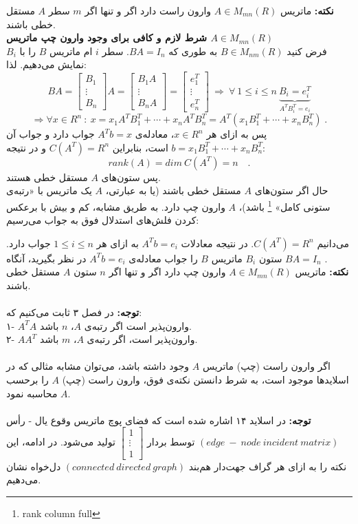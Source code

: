 \textbf{نکته:}
 ماتریس $A\in M_{mn}(R) $ وارون راست دارد اگر و تنها اگر $m$ سطر $A$ مستقل خطی باشند.\\
\textbf{شرط لازم و کافی برای وجود وارون چپ ماتریس $A\in M_{mn}(R)$}\\
فرض کنید $B\in M_{nm}(R)$ به طوری که $BA=I_n$. سطر $i$ ام ماتریس $B$ را با $B_i$ نمایش می‌دهیم. لذا:
$$BA = \begin{bmatrix}
B_1\\ \vdots \\ B_n
\end{bmatrix}A = \begin{bmatrix}
B_1A\\ \vdots \\ B_nA
\end{bmatrix}= \begin{bmatrix}
e_1^T\\ \vdots \\ e_n^T
\end{bmatrix} \: \Rightarrow \: \forall \: 1 \leq i \leq n\: \underbrace{B_i = e_i^T}_{A^TB_i^T = e_i}$$
$$\Rightarrow \forall x \in R^n \: :\: x= x_1A^TB_1^T+\cdots + x_nA^TB_n^T = A^T(x_1B_1^T+\cdots+ x_nB_n^T) \; .$$
پس به ازای هر $x\in R^n$، معادله‌ی $A^Tb = x$ جواب دارد و جواب آن $b = x_1B_1^T+\cdots+x_nB_n^T$ است، بنابراین $C(A^T)=R^n$ و در نتیجه:
$$rank(A) = dim\: C(A^T) = n\quad .$$
پس ستون‌های $A$ مستقل خطی هستند.\\
حال اگر ستون‌های $A$ مستقل خطی باشند (یا به عبارتی، $A$ یک ماتریس با «رتبه‌ی ستونی کامل» \footnote{rank column full} باشد)،  $A$ وارون چپ دارد. به طریق مشابه، کم و بیش با برعکس کردن فلش‌های استدلال فوق به جواب می‌رسیم:

می‌دانیم
$C(A^T) = R^n$. در نتیجه معادلات $A^Tb = e_i$ به ازای هر $1\leq i \leq n$ جواب دارد. ستون $B_i$ ماتریس $B$ را جواب معادله‌ی $A^Tb = e_i$ در نظر بگیرید، آنگاه $BA=I_n$ .\\
\textbf{نکته:}
ماتریس $A\in M_{mn}(R)$ وارون چپ دارد اگر و تنها اگر $n$ ستون $A$ مستقل خطی باشند.\\\\
\textbf{توجه:} در فصل ۳ ثابت می‌کنیم که:\\
۱- $A^TA$ وارون‌پذیر است اگر رتبه‌ی $A$، $n$ باشد.\\
۲- $AA^T$ وارون‌پذیر است، اگر رتبه‌ی $A$، $m$ باشد.\\\\
اگر وارون راست (چپ) ماتریس $A$ وجود داشته باشد، می‌توان مشابه مثالی که در اسلاید‌ها موجود است، به شرط دانستن نکته‌ی فوق، وارون راست (چپ) $A$ را برحسب $A$ محاسبه نمود.\\\\
\textbf{توجه:}
در اسلاید ۱۴ اشاره شده است که فضا‌ی پوچ ماتریس وقوع یال - رأس $(edge\: -\:node \:incident\: matrix)$ توسط بردار 
$\begin{bmatrix}
1\\ \vdots \\ 1
\end{bmatrix}$ تولید می‌شود. در ادامه، این نکته را به ازای هر گراف جهت‌دار هم‌بند $(connected \: directed\: graph)$ دل‌خواه نشان می‌دهیم.

